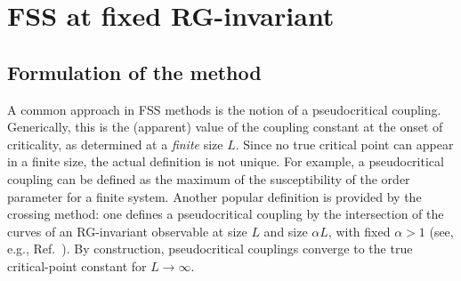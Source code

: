 \documentclass[pre,twocolumn]{revtex4-2}
\begin{document}
\section{FSS at fixed RG-invariant}
\label{sec:fss}

\subsection{Formulation of the method}
\label{sec:fss:method}
A common approach in FSS methods \cite{Privman-90} is the notion of a pseudocritical coupling.
Generically, this is the (apparent) value of the coupling constant at the onset of criticality, as determined at a {\it finite} size $L$.
Since no true critical point can appear in a finite size, the actual definition is not unique.
For example, a pseudocritical coupling can be defined as the maximum of the susceptibility of the order parameter for a finite system.
Another popular definition is provided by the crossing method: one defines a pseudocritical coupling by the intersection of the curves of an RG-invariant observable at size $L$ and size $\alpha L$, with fixed $\alpha > 1$ (see, e.g., Ref.~\cite{PTHAH-14}).
By construction, pseudocritical couplings converge to the true critical-point constant for $L\rightarrow \infty$.
\end{document}
